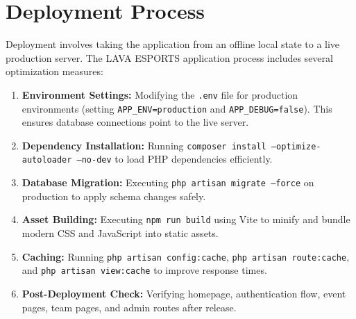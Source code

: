 \section{Deployment Process}
Deployment involves taking the application from an offline local state to a live production server. The LAVA ESPORTS application process includes several optimization measures:
\begin{enumerate}
    \item \textbf{Environment Settings:} Modifying the \texttt{.env} file for production environments (setting \texttt{APP\_ENV=production} and \texttt{APP\_DEBUG=false}). This ensures database connections point to the live server.
    \item \textbf{Dependency Installation:} Running \texttt{composer install --optimize-autoloader --no-dev} to load PHP dependencies efficiently.
    \item \textbf{Database Migration:} Executing \texttt{php artisan migrate --force} on production to apply schema changes safely.
    \item \textbf{Asset Building:} Executing \texttt{npm run build} using Vite to minify and bundle modern CSS and JavaScript into static assets.
    \item \textbf{Caching:} Running \texttt{php artisan config:cache}, \texttt{php artisan route:cache}, and \texttt{php artisan view:cache} to improve response times.
    \item \textbf{Post-Deployment Check:} Verifying homepage, authentication flow, event pages, team pages, and admin routes after release.
\end{enumerate}
